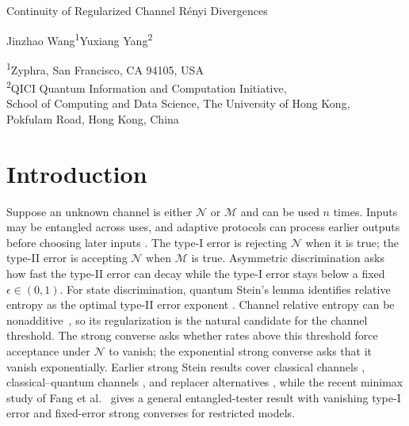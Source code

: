 \documentclass[11pt,letterpaper]{article}
\numberwithin{equation}{section}
\newcommand{\N}{\mathcal N}
\newcommand{\M}{\mathcal M}
\begin{document}
\begin{center}
{\LARGE Continuity of Regularized Channel R\'enyi Divergences\par}
\vspace{8pt}
{\large Jinzhao Wang\textsuperscript{1}\qquad Yuxiang Yang\textsuperscript{2}\par}
\vspace{5pt}
{\small
\textsuperscript{1}Zyphra, San Francisco, CA 94105, USA\\
\textsuperscript{2}QICI Quantum Information and Computation Initiative,\\
School of Computing and Data Science, The University of Hong Kong,\\
Pokfulam Road, Hong Kong, China\par}
\end{center}
\vspace{2pt}
\begin{abstract}
We prove that the regularized, stabilized sandwiched R\'enyi divergence of finite-dimensional quantum channels converges to their regularized relative entropy as the R\'enyi order tends to one. The key tool is the channel hockey-stick divergence: Gour's Stinespring approximation bound and a Schatten norm estimate amplify an asymptotic bound below one into exponential decay at higher threshold rates. For channel pairs with finite max-relative entropy, known operational connections then give exponential strong converses for parallel and adaptive discrimination, a sharp zero--one testing law, and the subchannel asymptotic equipartition property. We also provide a Lean formalization to certify our proof.
\end{abstract}

\section{Introduction}\label{sec:problem}
Suppose an unknown channel is either $\N$ or $\M$ and can be used $n$ times. Inputs may be entangled across uses, and adaptive protocols can process earlier outputs before choosing later inputs \cite{WBHK}. The type-I error is rejecting $\N$ when it is true; the type-II error is accepting $\N$ when $\M$ is true. Asymmetric discrimination asks how fast the type-II error can decay while the type-I error stays below a fixed $\epsilon\in(0,1)$. For state discrimination, quantum Stein's lemma identifies relative entropy as the optimal type-II error exponent \cite{HP,ON}. Channel relative entropy can be nonadditive~\cite{FFRS}, so its regularization is the natural candidate for the channel threshold. The strong converse asks whether rates above this threshold force acceptance under $\N$ to vanish; the exponential strong converse asks that it vanish exponentially. Earlier strong Stein results cover classical channels \cite{Hayashi}, classical--quantum channels \cite{WBHK}, and replacer alternatives \cite{CMW}, while the recent minimax study of Fang et al.~\cite{FCCGH} gives a general entangled-tester result with vanishing type-I error and fixed-error strong converses for restricted models.
\end{document}
